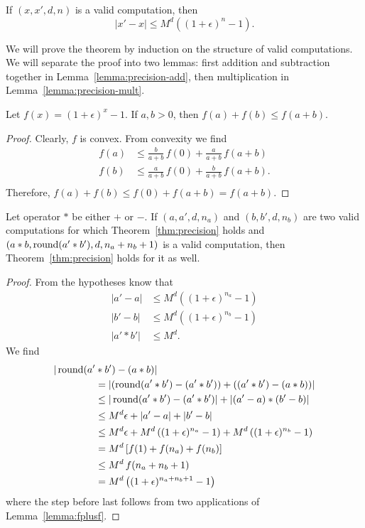 {
    \newcommand{\f}[1]{(1+\epsilon)^{#1}-1}
    \newcommand{\mdfn}[2]{M^{#1}\left(\f{#2}\right)}

    \begin{thm}\label{thm:precision}
    If $(x,x',d,n)$ is a valid computation, then \[|x'-x| \leq \mdfn{d}{n}.\]
    \end{thm}

    We will prove the theorem by induction on the structure of valid computations. We will separate the proof into two lemmas: first addition and subtraction together in Lemma~\ref{lemma:precision-add}, then multiplication in Lemma~\ref{lemma:precision-mult}.

    \begin{lemma}\label{lemma:fplusf}
    Let $f(x) = \f{x}$. If $a,b>0$, then $f(a) + f(b) \leq f(a+b)$.
    \end{lemma}
    \begin{proof}
    Clearly, $f$ is convex. From convexity we find
    \begin{align*}
    f(a) &\leq \frac{b}{a+b}\,f(0) + \frac{a}{a+b}\,f(a+b)\\
    f(b) &\leq \frac{a}{a+b}\,f(0) + \frac{b}{a+b}\,f(a+b).\\
    \end{align*}
    Therefore, $f(a) + f(b) \leq f(0) + f(a+b) = f(a+b)$.
    \end{proof}

    \begin{lemma}\label{lemma:precision-add}
    Let operator $\ast$ be either $+$ or $-$.
    If $(a,a',d,n_a)$ and $(b,b',d,n_b)$ are two valid computations for which Theorem~\ref{thm:precision} holds and $(a\ast b,\operatorname{round}(a'\ast b'),d,n_a+n_b+1)$ is a valid computation, then Theorem~\ref{thm:precision} holds for it as well.
    \end{lemma}
    \begin{proof}
    From the hypotheses know that
    \begin{align*}
    |a'-a| &\leq \mdfn{d}{n_a}\\
    |b'-b| &\leq \mdfn{d}{n_b}\\
    |a' \ast b'| &\leq M^d.
    \end{align*}
    We find
    \begin{align*}
    |\round(a'&\ast b') - (a \ast b)| \\
    &= |(\round(a'\ast b') - (a'\ast b')) + ((a'\ast b') - (a\ast b))| \\
    &\leq |\round(a'\ast b') - (a'\ast b')| + |(a'-a) \ast (b'-b)| \\
    &\leq M^d\epsilon + |a'-a| + |b'-b| \\
    &\leq M^d\epsilon + \mdfn{d}{n_a} + \mdfn{d}{n_b} \\
    &= M^d\left[f(1) + f(n_a) + f(n_b)\right] \\
    &\leq M^d\,f(n_a+n_b+1)\\
    &= \mdfn{d}{n_a+n_b+1}
    \end{align*}
    where the step before last follows from two applications of Lemma~\ref{lemma:fplusf}.
    \end{proof}
    
}
